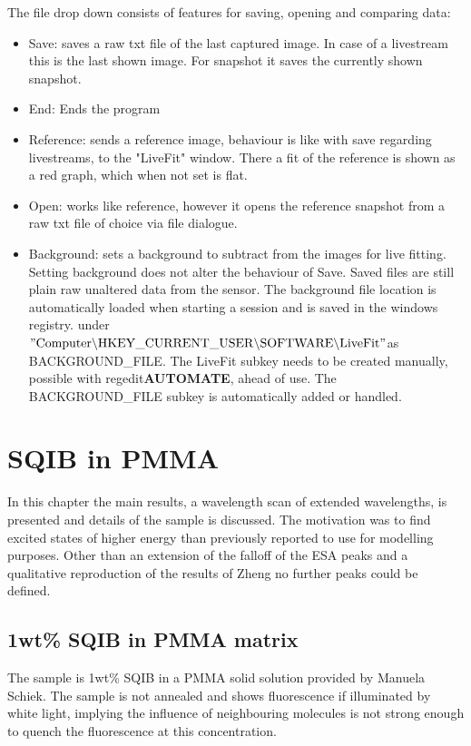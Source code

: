 \documentclass[twoside,openright]{scrreprt}
\begin{document}
The file drop down consists of features for saving, opening and comparing data:
\begin{itemize}
\item Save: saves a raw txt file of the last captured image. In case of a livestream this is the last shown image. For snapshot it saves the currently shown snapshot.
\item End: Ends the program
\item Reference: sends a reference image, behaviour is like with save regarding livestreams, to the "LiveFit" window. There a fit of the reference is shown as a red graph, which when not set is flat.
\item Open: works like reference, however it opens the reference snapshot from a raw txt file of choice via file dialogue.
\item Background: sets a background to subtract from the images for live fitting. Setting background does not alter the behaviour of Save. Saved files are still plain raw unaltered data from the sensor. The background file location is automatically loaded when starting a session and is saved in the windows registry. under $\mathrm{"Computer \backslash HKEY\_CURRENT\_USER \backslash SOFTWARE \backslash LiveFit"}$as BACKGROUND\_FILE. The LiveFit subkey needs to be created manually, possible with regedit\textbf{AUTOMATE}, ahead of use. The BACKGROUND\_FILE subkey is automatically added or handled.
\end{itemize}


\chapter{SQIB in PMMA}\label{chpt:results}
In this chapter the main results, a wavelength scan of extended wavelengths, is presented and details of the sample is discussed. The motivation was to find excited states of higher energy than previously reported to use for modelling purposes. Other than an extension of the falloff of the ESA peaks and a qualitative reproduction of the results of Zheng\cite{Zheng2020} no further peaks could be defined.

\section{1wt\% SQIB in PMMA matrix}
The sample is 1wt\% SQIB in a PMMA solid solution provided by Manuela Schiek. The sample is not annealed and shows fluorescence if illuminated by white light, implying the influence of neighbouring molecules is not strong enough to quench the fluorescence at this concentration. \\
\end{document}
